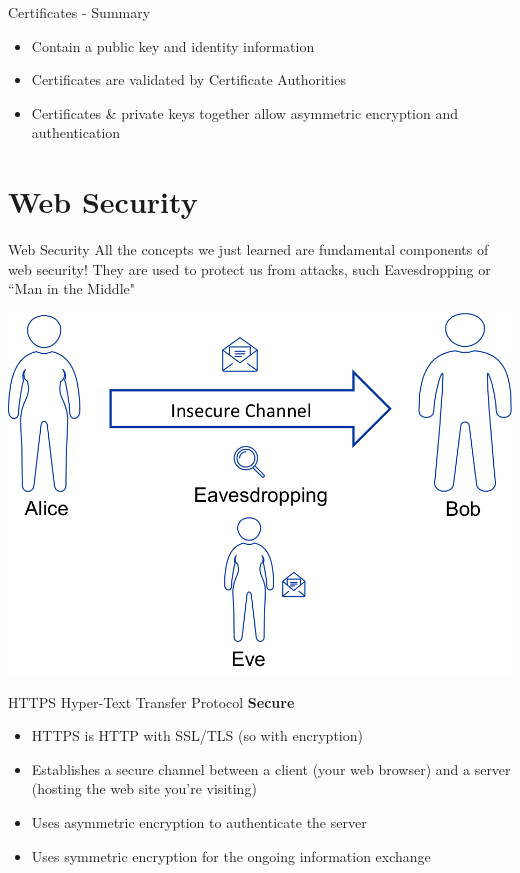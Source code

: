 \documentclass{beamer}
\begin{document}
\begin{frame}{Certificates - Summary}
\begin{itemize}
\item Contain a public key and identity information
\item Certificates are validated by Certificate Authorities
\item Certificates \& private keys together allow asymmetric encryption and authentication
\end{itemize}
\end{frame}

\section{Web Security}
\frame{\sectionpage}

\begin{frame}{Web Security}
All the concepts we just learned are fundamental components of web security! They are used to protect us from attacks, such Eavesdropping or ``Man in the Middle"
\begin{center}
	\includegraphics[width=0.5\linewidth]{insecure-channel.png}
\end{center}
\end{frame}

\begin{frame}{{\color{red}HTTPS}}
Hyper-Text Transfer Protocol \textbf{Secure} 
\begin{itemize}
\item HTTPS is HTTP with SSL/TLS (so with encryption)
\item Establishes a secure channel between a client (your web browser) and a server (hosting the web site you're visiting) 
\item Uses asymmetric encryption to authenticate the server 
\item Uses symmetric encryption for the ongoing information exchange
\end{itemize}
\end{frame}
\end{document}

